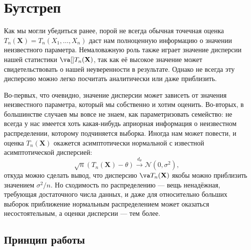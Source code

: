 \section{Бутстреп}

Как мы могли убедиться ранее, порой не всегда обычная точечная оценка $T_n(\mathbf X) = T_n(X_1, \ldots, X_n)$ даст нам полноценную информацию о значении неизвестного параметра. Немаловажную роль также играет значение дисперсии нашей статистики $\va[] T_n(\mathbf X)$, так как её высокое значение может свидетельствовать о нашей неуверенности в результате. Однако не всегда эту дисперсию можно легко посчитать аналитически или даже приблизить. 

Во-первых, что очевидно, значение дисперсии может зависеть от значения неизвестного параметра, который мы собственно и хотим оценить. Во-вторых, в большинстве случаев мы вовсе не знаем, как параметризовать семейство: не всегда у нас имеется хоть какая-нибудь априорная информация о неизвестном распределении, которому подчиняется выборка. Иногда нам может повести, и оценка $T_n(\mathbf X)$ окажется асимптотически нормальной с известной асимптотической дисперсией:
\[
\sqrt{n}(T_n(\mathbf X) - \theta) \stackrel{d_{\theta}}{\longrightarrow} \mathcal{N}(0, \sigma^2),
\]
откуда можно сделать вывод, что дисперсию $\va T_n(\mathbf X)$ якобы можно приблизить значением $\sigma^2 / n$. Но сходимость по распределению --- вещь ненадёжная, требующая достаточного числа данных, и даже для относительно больших выборок приближение нормальным распределением может оказаться несостоятельным, а оценки дисперсии --- тем более.

\subsection{Принцип работы}

